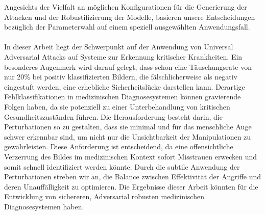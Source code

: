 Angesichts der Vielfalt an möglichen Konfigurationen für die Generierung der Attacken und der Robustifizierung der Modelle, basieren unsere Entscheidungen bezüglich der Parameterwahl auf einem speziell ausgewählten Anwendungsfall. 
\\
\\
In dieser Arbeit liegt der Schwerpunkt auf der Anwendung von Universal Adversarial Attacks auf Systeme zur Erkennung kritischer Krankheiten. Ein besonderes Augenmerk wird darauf gelegt, dass schon eine Täuschungsrate von nur 20\% bei positiv klassifizierten Bildern, die fälschlicherweise als negativ eingestuft werden, eine erhebliche Sicherheitslücke darstellen kann. Derartige Fehlklassifikationen in medizinischen Diagnosesystemen können gravierende Folgen haben, da sie potenziell zu einer Unterbehandlung von kritischen Gesundheitszuständen führen. Die Herausforderung besteht darin, die Perturbationen so zu gestalten, dass sie minimal und für das menschliche Auge schwer erkennbar sind, um nicht nur die Unsichtbarkeit der Manipulationen zu gewährleisten. Diese Anforderung ist entscheidend, da eine offensichtliche Verzerrung des Bildes im medizinischen Kontext sofort Misstrauen erwecken und somit schnell identifiziert werden könnte. Durch die subtile Anwendung der Perturbationen streben wir an, die Balance zwischen Effektivität der Angriffe und deren Unauffälligkeit zu optimieren. Die Ergebnisse dieser Arbeit könnten für die Entwicklung von sichereren, Adversarial robusten medizinischen Diagnosesystemen haben.